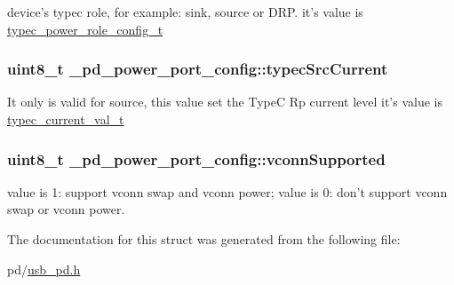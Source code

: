 device's typec role, for example\-: sink, source or D\-R\-P. it's value is \hyperlink{group__usb__pd__stack_ga8522facb45d87054c87e6d6fb32d9dd1}{typec\-\_\-power\-\_\-role\-\_\-config\-\_\-t} \hypertarget{struct__pd__power__port__config_aaec71cee54cf853e332a4b4ed1ef17ae}{
\subsubsection[{typec\-Src\-Current}]{\setlength{\rightskip}{0pt plus 5cm}uint8\-\_\-t \-\_\-pd\-\_\-power\-\_\-port\-\_\-config\-::typec\-Src\-Current}}\label{struct__pd__power__port__config_aaec71cee54cf853e332a4b4ed1ef17ae}
It only is valid for source, this value set the Type\-C Rp current level it's value is \hyperlink{group__usb__pd__stack_ga875b585c994b83a1c1fd1e81bac28f7a}{typec\-\_\-current\-\_\-val\-\_\-t} \hypertarget{struct__pd__power__port__config_aa552a27c5747ea789ad185fefac44194}{
\subsubsection[{vconn\-Supported}]{\setlength{\rightskip}{0pt plus 5cm}uint8\-\_\-t \-\_\-pd\-\_\-power\-\_\-port\-\_\-config\-::vconn\-Supported}}\label{struct__pd__power__port__config_aa552a27c5747ea789ad185fefac44194}
value is 1\-: support vconn swap and vconn power; value is 0\-: don't support vconn swap or vconn power. 

The documentation for this struct was generated from the following file\-:\begin{DoxyCompactItemize}
\item 
pd/\hyperlink{usb__pd_8h}{usb\-\_\-pd.\-h}\end{DoxyCompactItemize}
